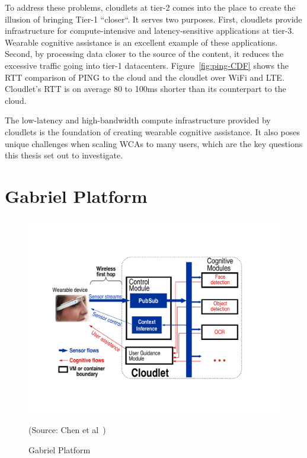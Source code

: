 To address these problems, cloudlets at tier-2 comes into the place to create
the illusion of bringing Tier-1 ``closer``. It serves two purposes. First,
cloudlets provide infrastructure for compute-intensive and latency-sensitive
applications at tier-3. Wearable cognitive assistance is an excellent example of
these applications. Second, by processing data closer to the source of the
content, it reduces the excessive traffic going into tier-1 datacenters.
Figure~\ref{fig:ping-CDF} shows the RTT comparison of PING to the cloud and the
cloudlet over WiFi and LTE. Cloudlet's RTT is on average 80 to 100ms shorter
than its counterpart to the cloud.

The low-latency and high-bandwidth compute infrastructure provided by cloudlets
is the foundation of creating wearable cognitive assistance. It also poses
unique challenges when scaling WCAs to many users, which are the key questions
this thesis set out to investigate. 


\section{Gabriel Platform}
\begin{figure}
\centering
\includegraphics[width=0.8\linewidth]{FIGS/fig-backend-structure-simple-crop.pdf}
\begin{captiontext}
{\rm (Source: Chen et al~\cite{chen2017empirical})}
\end{captiontext}
\caption{\small Gabriel Platform}
\label{fig:gabriel}
\end{figure}

